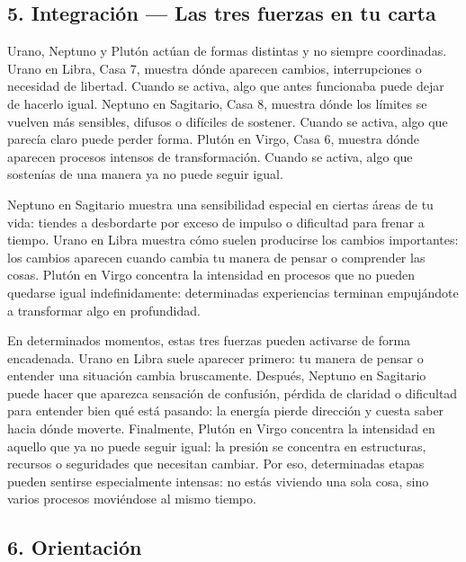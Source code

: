 \documentclass[11pt,a4paper]{article}
\begin{document}
\subsection{5. Integración — Las tres fuerzas en tu carta}

Urano, Neptuno y Plutón actúan de formas distintas y no siempre coordinadas. Urano en Libra, Casa 7, muestra dónde aparecen cambios, interrupciones o necesidad de libertad. Cuando se activa, algo que antes funcionaba puede dejar de hacerlo igual. Neptuno en Sagitario, Casa 8, muestra dónde los límites se vuelven más sensibles, difusos o difíciles de sostener. Cuando se activa, algo que parecía claro puede perder forma. Plutón en Virgo, Casa 6, muestra dónde aparecen procesos intensos de transformación. Cuando se activa, algo que sostenías de una manera ya no puede seguir igual.

Neptuno en Sagitario muestra una sensibilidad especial en ciertas áreas de tu vida: tiendes a desbordarte por exceso de impulso o dificultad para frenar a tiempo. Urano en Libra muestra cómo suelen producirse los cambios importantes: los cambios aparecen cuando cambia tu manera de pensar o comprender las cosas. Plutón en Virgo concentra la intensidad en procesos que no pueden quedarse igual indefinidamente: determinadas experiencias terminan empujándote a transformar algo en profundidad.

En determinados momentos, estas tres fuerzas pueden activarse de forma encadenada. Urano en Libra suele aparecer primero: tu manera de pensar o entender una situación cambia bruscamente. Después, Neptuno en Sagitario puede hacer que aparezca sensación de confusión, pérdida de claridad o dificultad para entender bien qué está pasando: la energía pierde dirección y cuesta saber hacia dónde moverte. Finalmente, Plutón en Virgo concentra la intensidad en aquello que ya no puede seguir igual: la presión se concentra en estructuras, recursos o seguridades que necesitan cambiar. Por eso, determinadas etapas pueden sentirse especialmente intensas: no estás viviendo una sola cosa, sino varios procesos moviéndose al mismo tiempo.

\vspace{0.8cm}

\subsection{6. Orientación}
\end{document}
